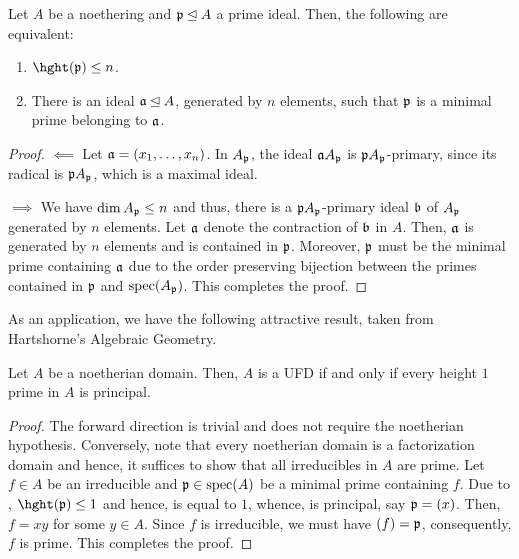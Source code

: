 \begin{corollary}
    Let $A$ be a noethering and $\mathfrak p\unlhd A$ a prime ideal. Then, the following are equivalent: 
    \begin{enumerate}[label=(\alph*)]
        \item $\hght(\frakp)\le n$. 
        \item There is an ideal $\mathfrak a\unlhd A$, generated by $n$ elements, such that $\mathfrak p$ is a minimal prime belonging to $\mathfrak a$.
    \end{enumerate}
\end{corollary}
\begin{proof}
    $\impliedby$ Let $\mathfrak a = (x_1,\dots,x_n)$. In $A_\mathfrak p$, the ideal $\mathfrak a A_\mathfrak p$ is $\mathfrak p A_\mathfrak p$-primary, since its radical is $\mathfrak p A_\mathfrak p$, which is a maximal ideal. 

    $\implies$ We have $\dim A_\mathfrak p\le n$ and thus, there is a $\mathfrak p A_\mathfrak p$-primary ideal $\mathfrak b$ of $A_\mathfrak p$ generated by $n$ elements. Let $\mathfrak a$ denote the contraction of $\mathfrak b$ in $A$. Then, $\mathfrak a$ is generated by $n$ elements and is contained in $\mathfrak p$. Moreover, $\mathfrak p$ must be the minimal prime containing $\mathfrak a$ due to the order preserving bijection between the primes contained in $\mathfrak p$ and $\operatorname{spec}(A_\mathfrak p)$. This completes the proof.\qedhere
\end{proof}

As an application, we have the following attractive result, taken from Hartshorne's Algebraic Geometry.

\begin{proposition}
    Let $A$ be a noetherian domain. Then, $A$ is a UFD if and only if every height $1$ prime in $A$ is principal.
\end{proposition}
\begin{proof}
    The forward direction is trivial and does not require the noetherian hypothesis. Conversely, note that every noetherian domain is a factorization domain and hence, it suffices to show that all irreducibles in $A$ are prime. Let $f\in A$ be an irreducible and $\mathfrak p\in\operatorname{spec}(A)$ be a minimal prime containing $f$. Due to , $\hght(\frakp)\le 1$ and hence, is equal to $1$, whence, is principal, say $\mathfrak p = (x)$. Then, $f = xy$ for some $y\in A$. Since $f$ is irreducible, we must have $(f) = \mathfrak p$, consequently, $f$ is prime. This completes the proof.
\end{proof}

